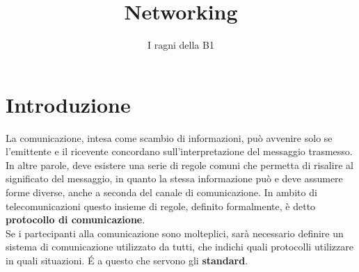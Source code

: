 \documentclass[a4paper,11pt]{article}
\title{Networking}
\author{I ragni della B1}
\begin{document}
\maketitle
\newpage
\tableofcontents
\newpage

\section{Introduzione}
La comunicazione, intesa come scambio di informazioni, può avvenire solo se l'emittente e il ricevente concordano sull'interpretazione del messaggio trasmesso. In altre parole, deve esistere una serie di regole comuni che permetta di risalire al significato del messaggio, in quanto la stessa informazione può e deve assumere forme diverse, anche a seconda del canale di comunicazione.
In ambito di telecomunicazioni questo insieme di regole, definito formalmente, è detto \textbf{protocollo di comunicazione}. \\Se i partecipanti alla comunicazione sono molteplici, sarà necessario definire un sistema di comunicazione utilizzato da tutti, che indichi quali protocolli utilizzare in quali situazioni. \'E a questo che servono gli \textbf{standard}.
\end{document}
